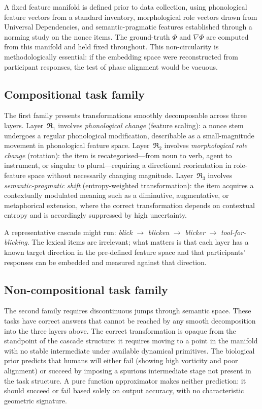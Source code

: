\documentclass[12pt, a4paper]{article}
\theoremstyle{remark}
\theoremstyle{definition}
\newcommand{\Rk}{\mathfrak{R}}
\newcommand{\Phif}{\Phi}
\begin{document}
A fixed feature manifold is defined prior to data collection, using phonological feature
vectors from a standard inventory, morphological role vectors drawn from Universal
Dependencies, and semantic-pragmatic features established through a norming study on the
nonce items.  The ground-truth $\Phif$ and $\nabla\Phif$ are computed from this manifold
and held fixed throughout.  This non-circularity is methodologically essential: if the
embedding space were reconstructed from participant responses, the test of phase alignment
would be vacuous.

\subsection{Compositional task family}

The first family presents transformations smoothly decomposable across three layers.
Layer~$\Rk_1$ involves \emph{phonological change} (feature scaling): a nonce stem undergoes
a regular phonological modification, describable as a small-magnitude movement in
phonological feature space.  Layer~$\Rk_2$ involves \emph{morphological role change}
(rotation): the item is recategorised---from noun to verb, agent to instrument, or singular
to plural---requiring a directional reorientation in role-feature space without necessarily
changing magnitude.  Layer~$\Rk_3$ involves \emph{semantic-pragmatic shift}
(entropy-weighted transformation): the item acquires a contextually modulated meaning such
as a diminutive, augmentative, or metaphorical extension, where the correct transformation
depends on contextual entropy and is accordingly suppressed by high uncertainty.

A representative cascade might run: \emph{blick} $\to$ \emph{blicken} $\to$
\emph{blicker} $\to$ \emph{tool-for-blicking}.  The lexical items are irrelevant; what
matters is that each layer has a known target direction in the pre-defined feature space
and that participants' responses can be embedded and measured against that direction.

\subsection{Non-compositional task family}

The second family requires discontinuous jumps through semantic space.  These tasks have
correct answers that cannot be reached by any smooth decomposition into the three layers
above.  The correct transformation is opaque from the standpoint of the cascade structure:
it requires moving to a point in the manifold with no stable intermediate under available
dynamical primitives.  The biological prior predicts that humans will either fail
(showing high vorticity and poor alignment) or succeed by imposing a spurious intermediate
stage not present in the task structure.  A pure function approximator makes neither
prediction: it should succeed or fail based solely on output accuracy, with no
characteristic geometric signature.
\end{document}
